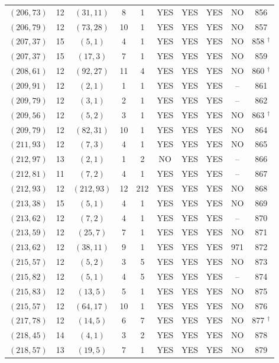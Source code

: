 \begin{longtable}{|c|c|c|c|c|c|c|c|c|c|}
$(206, 73)$ & 12 & $(31, 11)$ & 8 & 1 & YES & YES & YES & NO & 856\\
$(206, 79)$ & 12 & $(73, 28)$ & 10 & 1 & YES & YES & YES & NO & 857\\
$(207, 37)$ & 15 & $(5, 1)$ & 4 & 1 & YES & YES & YES & NO & 858 ${}^\dagger$\\
$(207, 37)$ & 15 & $(17, 3)$ & 7 & 1 & YES & YES & YES & NO & 859\\
$(208, 61)$ & 12 & $(92, 27)$ & 11 & 4 & YES & YES & YES & NO & 860 ${}^\dagger$\\
$(209, 91)$ & 12 & $(2, 1)$ & 1 & 1 & YES & YES & YES & -- & 861\\
$(209, 79)$ & 12 & $(3, 1)$ & 2 & 1 & YES & YES & YES & -- & 862\\
$(209, 56)$ & 12 & $(5, 2)$ & 3 & 1 & YES & YES & YES & NO & 863 ${}^\dagger$\\
$(209, 79)$ & 12 & $(82, 31)$ & 10 & 1 & YES & YES & YES & NO & 864\\
$(211, 93)$ & 12 & $(7, 3)$ & 4 & 1 & YES & YES & YES & NO & 865\\
$(212, 97)$ & 13 & $(2, 1)$ & 1 & 2 & NO & YES & YES & -- & 866\\
$(212, 81)$ & 11 & $(7, 2)$ & 4 & 1 & YES & YES & YES & -- & 867\\
$(212, 93)$ & 12 & $(212, 93)$ & 12 & 212 & YES & YES & YES & NO & 868\\
$(213, 38)$ & 15 & $(5, 1)$ & 4 & 1 & YES & YES & YES & NO & 869\\
$(213, 62)$ & 12 & $(7, 2)$ & 4 & 1 & YES & YES & YES & -- & 870\\
$(213, 59)$ & 12 & $(25, 7)$ & 7 & 1 & YES & YES & YES & NO & 871\\
$(213, 62)$ & 12 & $(38, 11)$ & 9 & 1 & YES & YES & YES & 971 & 872\\
$(215, 57)$ & 12 & $(5, 2)$ & 3 & 5 & YES & YES & YES & NO & 873\\
$(215, 82)$ & 12 & $(5, 1)$ & 4 & 5 & YES & YES & YES & -- & 874\\
$(215, 83)$ & 12 & $(13, 5)$ & 5 & 1 & YES & YES & YES & NO & 875\\
$(215, 57)$ & 12 & $(64, 17)$ & 10 & 1 & YES & YES & YES & NO & 876\\
$(217, 78)$ & 12 & $(14, 5)$ & 6 & 7 & YES & YES & YES & NO & 877 ${}^\dagger$\\
$(218, 45)$ & 14 & $(4, 1)$ & 3 & 2 & YES & YES & YES & NO & 878\\
$(218, 57)$ & 13 & $(19, 5)$ & 7 & 1 & YES & YES & YES & NO & 879\\

\end{longtable}

